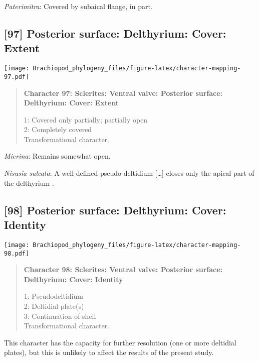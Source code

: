 \documentclass[openany]{book}
\theoremstyle{definition}
\theoremstyle{definition}
\theoremstyle{definition}
\theoremstyle{remark}
\begin{document}
\hypertarget{Paterimitra-coding-96}{}
\emph{Paterimitra}: Covered by subaical flange, in part.

\subsection*{{[}97{]} Posterior surface: Delthyrium: Cover:
Extent}\label{posterior-surface-delthyrium-cover-extent}

\texttt{[image: Brachiopod\_phylogeny\_files/figure-latex/character-mapping-97.pdf]}

\begin{quote}
\textbf{Character 97: Sclerites: Ventral valve: Posterior surface:
Delthyrium: Cover: Extent}

1: Covered only partially; partially open\\
2: Completely covered\\
Transformational character.
\end{quote}

\hypertarget{Micrina-coding-97}{}
\emph{Micrina}: Remains somewhat open.

\hypertarget{Nisusia_sulcata-coding-97}{}
\emph{Nisusia sulcata}: A well-defined pseudo-deltidium {[}\ldots{}{]}
closes only the apical part of\\
the delthyrium \citep{Rowell1985Theevolutionary}.

\subsection*{{[}98{]} Posterior surface: Delthyrium: Cover:
Identity}\label{posterior-surface-delthyrium-cover-identity}

\texttt{[image: Brachiopod\_phylogeny\_files/figure-latex/character-mapping-98.pdf]}

\begin{quote}
\textbf{Character 98: Sclerites: Ventral valve: Posterior surface:
Delthyrium: Cover: Identity}

1: Pseudodeltidium\\
2: Deltidial plate(s)\\
3: Continuation of shell\\
Transformational character.
\end{quote}

This character has the capacity for further resolution (one or more
deltidial plates), but this is unlikely to affect the results of the
present study.
\end{document}
